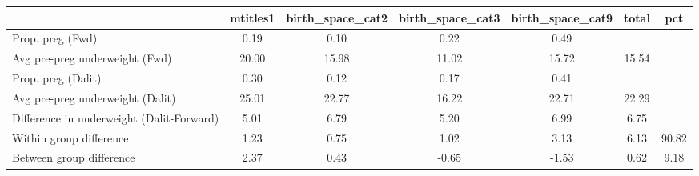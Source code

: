 \begin{tabular}{l*{6}{c}}
\toprule
            &\multicolumn{1}{c}{mtitles1}&\multicolumn{1}{c}{birth\_space\_cat2}&\multicolumn{1}{c}{birth\_space\_cat3}&\multicolumn{1}{c}{birth\_space\_cat9}&\multicolumn{1}{c}{total}&\multicolumn{1}{c}{pct}\\
\midrule
\midrule
Prop. preg (Fwd)&        0.19&        0.10&        0.22&        0.49&            &            \\
Avg pre-preg underweight (Fwd)&       20.00&       15.98&       11.02&       15.72&       15.54&            \\
Prop. preg (Dalit)&        0.30&        0.12&        0.17&        0.41&            &            \\
Avg pre-preg underweight (Dalit)&       25.01&       22.77&       16.22&       22.71&       22.29&            \\
Difference in underweight (Dalit-Forward)&        5.01&        6.79&        5.20&        6.99&        6.75&            \\
Within group difference&        1.23&        0.75&        1.02&        3.13&        6.13&       90.82\\
Between group difference&        2.37&        0.43&       -0.65&       -1.53&        0.62&        9.18\\
\bottomrule
\end{tabular}
